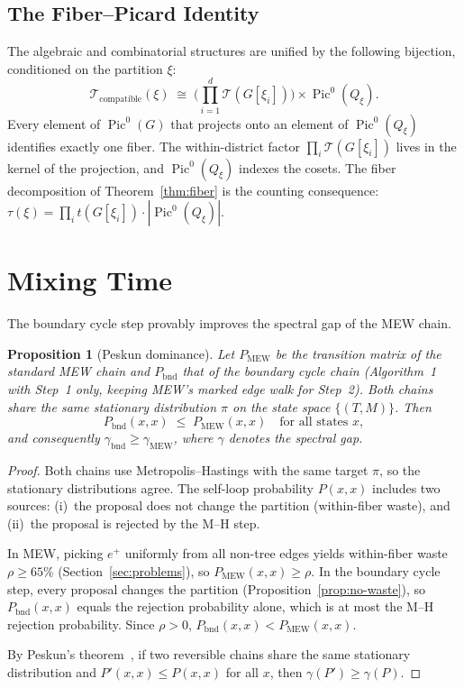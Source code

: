 \documentclass[11pt]{article}
\newtheorem{proposition}{Proposition}[section]
\newcommand{\Pic}{\operatorname{Pic}^0}
\begin{document}
\subsection{The Fiber--Picard Identity}

The algebraic and combinatorial structures are unified by the following
bijection, conditioned on the partition $\xi$:
\[
  \mathcal{T}_{\mathrm{compatible}}(\xi) \;\cong\;
  \biggl(\prod_{i=1}^d \mathcal{T}(G[\xi_i])\biggr) \times \Pic(Q_{\xi}).
\]
Every element of $\Pic(G)$ that projects onto an element of $\Pic(Q_{\xi})$
identifies exactly one fiber. The within-district factor
$\prod_i \mathcal{T}(G[\xi_i])$ lives in the kernel of the projection, and
$\Pic(Q_{\xi})$ indexes the cosets. The fiber decomposition of
Theorem~\ref{thm:fiber} is the counting consequence:
$\tau(\xi) = \prod_i t(G[\xi_i]) \cdot |\Pic(Q_{\xi})|$.


\section{Mixing Time}\label{sec:mixing}

The boundary cycle step provably improves the spectral gap of the MEW chain.

\begin{proposition}[Peskun dominance]\label{prop:peskun}
Let $P_{\mathrm{MEW}}$ be the transition matrix of the standard MEW chain and
$P_{\mathrm{bnd}}$ that of the boundary cycle chain (Algorithm~1 with Step~1
only, keeping MEW's marked edge walk for Step~2). Both chains share the same
stationary distribution $\pi$ on the state space $\{(T,M)\}$. Then
\[
  P_{\mathrm{bnd}}(x, x) \;\leq\; P_{\mathrm{MEW}}(x, x)
  \quad \text{for all states } x,
\]
and consequently $\gamma_{\mathrm{bnd}} \geq \gamma_{\mathrm{MEW}}$, where
$\gamma$ denotes the spectral gap.
\end{proposition}

\begin{proof}
Both chains use Metropolis--Hastings with the same target $\pi$, so the
stationary distributions agree. The self-loop probability $P(x,x)$ includes
two sources: (i)~the proposal does not change the partition (within-fiber
waste), and (ii)~the proposal is rejected by the M--H step.

In MEW, picking $e^+$ uniformly from all non-tree edges yields within-fiber
waste $\rho \geq 65\%$ (Section~\ref{sec:problems}), so
$P_{\mathrm{MEW}}(x,x) \geq \rho$. In the boundary cycle step, every proposal
changes the partition (Proposition~\ref{prop:no-waste}), so
$P_{\mathrm{bnd}}(x,x)$ equals the rejection probability alone, which is at
most the M--H rejection probability. Since $\rho > 0$,
$P_{\mathrm{bnd}}(x,x) < P_{\mathrm{MEW}}(x,x)$.

By Peskun's theorem~\cite{peskun1973}, if two reversible chains share the same
stationary distribution and $P'(x,x) \leq P(x,x)$ for all $x$, then
$\gamma(P') \geq \gamma(P)$.
\end{proof}
\end{document}
